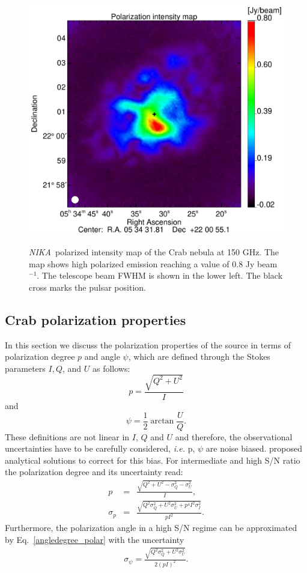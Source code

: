 \documentclass[twocolumn,traditabstract]{aa}
\def\NIKA{\textit{NIKA}}
\begin{document}
 \begin{figure}
  \centering
      {\includegraphics[width=0.75\linewidth,keepaspectratio]{figures/Crab_ipol_v3_2mm.pdf}}
\caption{\NIKA\ polarized intensity map of the  Crab nebula at 150 GHz. The map shows high polarized emission reaching a value of 0.8 Jy beam$^{-1}$. The telescope beam FWHM is shown in the lower left. The black cross marks the pulsar position.}
\label{crab_ipol_maps}		
  \end{figure}
 


\subsection{Crab polarization properties}\label{sec:pol_properties}
In this section we discuss the polarization properties of the source in terms of polarization degree $p$ and angle $\psi$, which are defined through the Stokes parameters $I, Q$, and $U$ as follows:
\begin{equation}
 p    = \frac{\sqrt{Q^2 + U^2}}{I} \nonumber 
\end{equation}
and
 \begin{equation}
 \psi = \frac{1}{2}\arctan\frac{U}{Q}.\label{angledegree_polar}
 \end{equation}
These definitions are not linear in $I$, $Q$ and $U$ and therefore, the observational uncertainties have to be carefully considered, {\it i.e.} p, $\psi$ are noise biased. 
\citet{1980A&A....91...97S,1985A&A...142..100S,montier} proposed analytical solutions to correct for this bias. For intermediate and high S/N ratio the polarization degree and its uncertainty read:
 \begin{eqnarray}
 p    &=& \frac{\sqrt{Q^2 + U^2 - \sigma_{Q}^2 - \sigma_{U}^2}}{I}, \nonumber \\ 
  \sigma_{p} &=& \frac{\sqrt{Q^2\sigma_Q^2 + U^2\sigma_U^2 + p^4I^2\sigma_I^2}}{pI^2}.
  \label{p_true_degree}
 \end{eqnarray}
 Furthermore, the polarization angle in a high S/N regime can be approximated by Eq.~\ref{angledegree_polar} with the uncertainty
  \begin{eqnarray}\label{angle_uncertainty}
  \sigma_{\psi} = \frac{\sqrt{Q^2\sigma_Q^2 + U^2\sigma_U^2}}{2(pI)^2}.
  \end{eqnarray}
\end{document}
